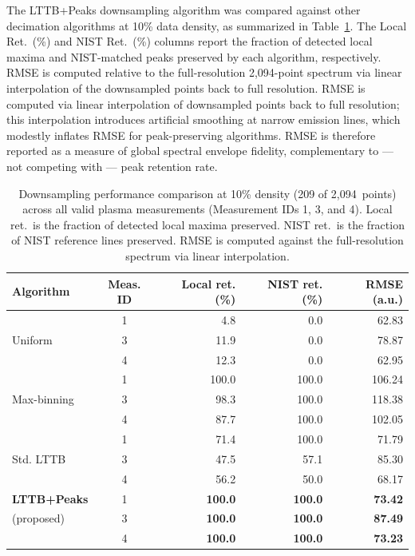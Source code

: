 \documentclass[final,5p,twocolumn,a4paper]{elsarticle}
\begin{document}
The LTTB+Peaks downsampling algorithm was compared against other decimation algorithms at 10\% data density, as summarized in Table~\ref{table:downsampling}. The Local Ret.\ (\%) and NIST Ret.\ (\%) columns report the fraction of detected local maxima and NIST-matched peaks preserved by each algorithm, respectively. RMSE is computed relative to the full-resolution 2,094-point spectrum via linear interpolation of the downsampled points back to full resolution. RMSE is computed via linear interpolation of downsampled points back to full resolution; this interpolation introduces artificial smoothing at narrow emission lines, which modestly inflates RMSE for peak-preserving algorithms. RMSE is therefore reported as a measure of global spectral envelope fidelity, complementary to — not competing with — peak retention rate.

\begin{table}[!htbp]
\centering
\footnotesize
\setlength{\tabcolsep}{6pt}
\begin{tabular}{@{}lcrrr@{}}
\toprule
\textbf{Algorithm} & \textbf{Meas. ID} & \textbf{Local ret. (\%)} & \textbf{NIST ret. (\%)} & \textbf{RMSE (a.u.)} \\
\midrule
            & 1 & 4.8  & 0.0   & 62.83  \\
Uniform     & 3 & 11.9 & 0.0   & 78.87  \\
            & 4 & 12.3 & 0.0   & 62.95  \\
\midrule
            & 1 & 100.0 & 100.0 & 106.24 \\
Max-binning & 3 & 98.3  & 100.0 & 118.38 \\
            & 4 & 87.7  & 100.0 & 102.05 \\
\midrule
            & 1 & 71.4 & 100.0 & 71.79  \\
Std. LTTB   & 3 & 47.5 & 57.1  & 85.30  \\
            & 4 & 56.2 & 50.0  & 68.17  \\
\midrule
\textbf{LTTB+Peaks} & 1 & \textbf{100.0} & \textbf{100.0} & \textbf{73.42}  \\
(proposed)          & 3 & \textbf{100.0} & \textbf{100.0} & \textbf{87.49}  \\
                    & 4 & \textbf{100.0} & \textbf{100.0} & \textbf{73.23}  \\
\bottomrule
\end{tabular}
\caption{Downsampling performance comparison at 10\% density (209 of 2,094~points) across all valid plasma measurements (Measurement IDs 1, 3, and 4). Local ret.\ is the fraction of detected local maxima preserved. NIST ret.\ is the fraction of NIST reference lines preserved. RMSE is computed against the full-resolution spectrum via linear interpolation.}
\label{table:downsampling}
\end{table}
\end{document}
